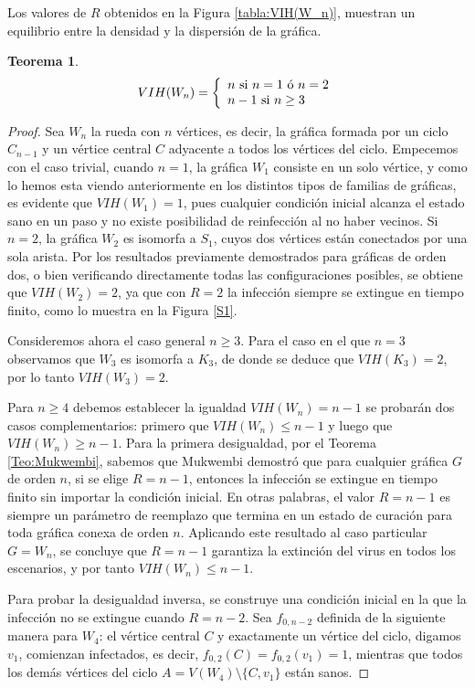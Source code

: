 \documentclass[12pt,titlepage,twoside,openright]{book}
\newtheorem{theorem}{Teorema}[section]
\begin{document}
Los valores de $R$ obtenidos en la Figura \ref{tabla:VIH(W_n)}, muestran un equilibrio entre la densidad y la dispersi\'on de la gr\'afica.
\begin{theorem}\label{Con:VIH(Wn)}
    $$
    VIH(W_n) = \left\lbrace
    \begin{array}{ll}
        n \textup{ si } n = 1 \textup{ \'o } n=2\\
        n-1 \textup{ si } n\geq3
    \end{array}
    \right.
    $$
\end{theorem}
\begin{proof}
    Sea $W_n$ la rueda con $n$ v\'ertices, es decir, la gr\'afica formada por un ciclo $C_{n-1}$ y un v\'ertice central $C$ adyacente a todos los v\'ertices del ciclo. Empecemos con el caso trivial, cuando $n=1$, la gr\'afica $W_1$ consiste en un solo v\'ertice, y como lo hemos esta viendo anteriormente en los distintos tipos de familias de gr\'aficas, es evidente que $VIH(W_1)=1$, pues cualquier condici\'on inicial alcanza el estado sano en un paso y no existe posibilidad de reinfecci\'on al no haber vecinos. Si $n=2$, la gr\'afica $W_2$ es isomorfa a $S_1$, cuyos dos v\'ertices est\'an conectados por una sola arista. Por los resultados previamente demostrados para gr\'aficas de orden dos, o bien verificando directamente todas las configuraciones posibles, se obtiene que $VIH(W_2)=2$, ya que con $R=2$ la infecci\'on siempre se extingue en tiempo finito, como lo muestra en la Figura \ref{S1}.

    Consideremos ahora el caso general $n\ge 3$. Para el caso en el que $n=3$ observamos que $W_3$ es isomorfa a $K_3$, de donde se deduce que $VIH(K_3) = 2$, por lo tanto $VIH(W_3)=2$. 
    
    Para $n\ge4$ debemos establecer la igualdad $VIH(W_n)=n-1$ se probar\'an dos casos complementarios: primero que $VIH(W_n)\le n-1$ y luego que $VIH(W_n)\ge n-1$. Para la primera desigualdad, por el Teorema \ref{Teo:Mukwembi}, sabemos que Mukwembi demostr\'o que para cualquier gr\'afica $G$ de orden $n$, si se elige $R=n-1$, entonces la infecci\'on se extingue en tiempo finito sin importar la condici\'on inicial. En otras palabras, el valor $R=n-1$ es siempre un par\'ametro de reemplazo que termina en un estado de curaci\'on para toda gr\'afica conexa de orden $n$. Aplicando este resultado al caso particular $G=W_n$, se concluye que $R=n-1$ garantiza la extinci\'on del virus en todos los escenarios, y por tanto $VIH(W_n)\le n-1$.

    Para probar la desigualdad inversa, se construye una condici\'on inicial en la que la infecci\'on no se extingue cuando $R=n-2$. Sea $f_{0,n-2}$ definida de la siguiente manera para $W_4$: el v\'ertice central $C$ y exactamente un v\'ertice del ciclo, digamos $v_1$, comienzan infectados, es decir, $f_{0,2}(C)=f_{0,2}(v_1)=1$, mientras que todos los dem\'as v\'ertices del ciclo $A = V(W_4) \setminus \{C,v_1\}$ est\'an sanos.
    

\end{proof}
\end{document}
